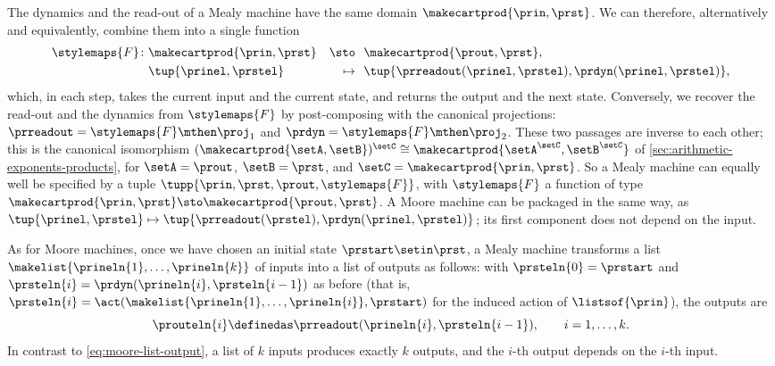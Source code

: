 \begin{remark}
    \label{rem:mealy-single-function}
    The dynamics and the read-out of a Mealy machine have the same domain $\makecartprod{\prin, \prst}$.
    We can therefore, alternatively and equivalently, combine them into a single function
    \begin{equation}
        \label{eq:mealy-single-function}
        \begin{aligned}
            \stylemaps{F} \colon & \makecartprod{\prin, \prst} & \sto     & \ \ \makecartprod{\prout, \prst}, \\
                                 & \tup{\prinel, \prstel}      & \mapsto & \ \ \tup{\prreadout(\prinel, \prstel), \prdyn(\prinel, \prstel)},
        \end{aligned}
    \end{equation}
    which, in each step, takes the current input and the current state, and returns the output and the next state.
    Conversely, we recover the read-out and the dynamics from $\stylemaps{F}$ by post-composing with the canonical projections: $\prreadout = \stylemaps{F} \mthen \proj_1$ and $\prdyn = \stylemaps{F} \mthen \proj_2$.
    These two passages are inverse to each other; this is the canonical isomorphism $(\makecartprod{\setA, \setB})^{\setC} \cong \makecartprod{\setA^{\setC}, \setB^{\setC}}$ of \cref{sec:arithmetic-exponents-products}, for $\setA = \prout$, $\setB = \prst$, and $\setC = \makecartprod{\prin, \prst}$.
    So a Mealy machine can equally well be specified by a tuple $\tupp{\prin, \prst, \prout, \stylemaps{F}}$, with $\stylemaps{F}$ a function of type $\makecartprod{\prin, \prst} \sto \makecartprod{\prout, \prst}$.
    A Moore machine can be packaged in the same way, as $\tup{\prinel, \prstel} \mapsto \tup{\prreadout(\prstel), \prdyn(\prinel, \prstel)}$; its first component does not depend on the input.
\end{remark}

As for Moore machines, once we have chosen an initial state $\prstart \setin \prst$, a Mealy machine transforms a list $\makelist{\prineln{1}, \dots, \prineln{k}}$ of inputs into a list of outputs as follows: with $\prsteln{0} = \prstart$ and $\prsteln{i} = \prdyn(\prineln{i}, \prsteln{i-1})$ as before (that is, $\prsteln{i} = \act(\makelist{\prineln{1}, \dots, \prineln{i}}, \prstart)$ for the induced action of $\listsof{\prin}$), the outputs are
\begin{equation}
    \label{eq:mealy-list-output}
    \prouteln{i} \definedas \prreadout(\prineln{i}, \prsteln{i-1}), \qquad i = 1, \dots, k.
\end{equation}
In contrast to \cref{eq:moore-list-output}, a list of $k$ inputs produces exactly $k$ outputs, and the $i$-th output depends on the $i$-th input.

